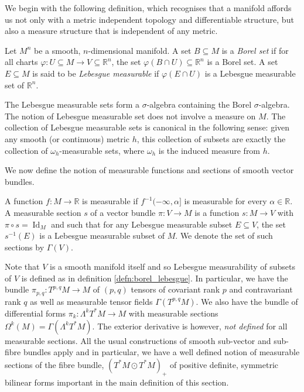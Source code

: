 \documentclass[AMS,STIX1COL]{WileyNJD-v2}
\numberwithin{equation}{section}
\renewcommand{\~}{\tilde}
\renewcommand{\-}{\bar}
\newcommand{\R}{\mathbb{R}}
\newcommand{\8}{\infty}
\DeclareMathOperator{\Id}{Id}
\begin{document}
We begin with the following definition, which recognises
that a manifold affords us not only with a metric independent 
topology and differentiable structure, but also a measure
structure that is independent of any metric.

\begin{defn}
\label{defn:borel_lebesgue}
Let \(M^n\) be a smooth, \(n\)-dimensional manifold. A set \(B \subseteq M\) is a \emph{Borel set} if for all charts \(\varphi : U \subseteq M \to V \subseteq \R^n\), the set \(\varphi(B \cap U) \subseteq \R^n\) is a Borel set. A set \(E \subseteq M\) is said to be \emph{Lebesgue measurable} if \(\varphi(E \cap U)\) is a Lebesgue measurable set of \(\R^n\).
\end{defn}

\begin{rem}
The Lebesgue measurable sets form a \(\sigma\)-algebra containing the Borel \(\sigma\)-algebra. The notion of Lebesgue measurable set does not involve a measure on \(M\). The collection of Lebesgue measurable sets is canonical in the following sense: given any smooth (or continuous) metric $h$, this collection of subsets are exactly the collection of $\omega_h$-measurable sets, where $\omega_h$ is the induced measure from $h$.
\end{rem}

We now define the notion of measurable functions and sections of smooth vector bundles.

\begin{defn}
A function $f: M \to \R$ is measurable if $f^{-1}(-\infty, \alpha]$ is measurable for every $\alpha  \in \R$. A measurable section \(s\) of a vector bundle \(\pi : V \to M\) is a function \(s: M \to V\) with \(\pi \circ s = \Id_M\) and such that for any Lebesgue measurable subset \(E \subseteq V\), the set \(s^{-1}(E)\) is a Lebesgue measurable subset of \(M\).  We denote the set of such sections by $\Gamma(V)$.
\end{defn}

Note that \(V\) is a smooth manifold itself and so Lebesgue measurability of subsets of \(V\) is defined as in definition \ref{defn:borel_lebesgue}. In particular, we have the bundle $\pi_{p,q} : T^{p,q}M \to M$ of $(p,q)$ tensors of covariant rank $p$ and contravariant rank $q$ as well as measurable tensor fields \(\Gamma(T^{p,q}M)\). We also have the bundle of differential forms \(\pi_k : \Lambda^k T^{\ast} M \to M\) with measurable sections \(\Omega^k(M) = \Gamma(\Lambda^k T^{\ast} M)\). The exterior derivative is however, \emph{not defined} for all measurable sections. All the usual constructions of smooth sub-vector and sub-fibre bundles apply and in particular, we have a well defined notion of measurable sections of the fibre bundle, \((T^{\ast} M \odot T^{\ast} M)_+\) of positive definite, symmetric bilinear forms important in the main definition of this section.
\end{document}

